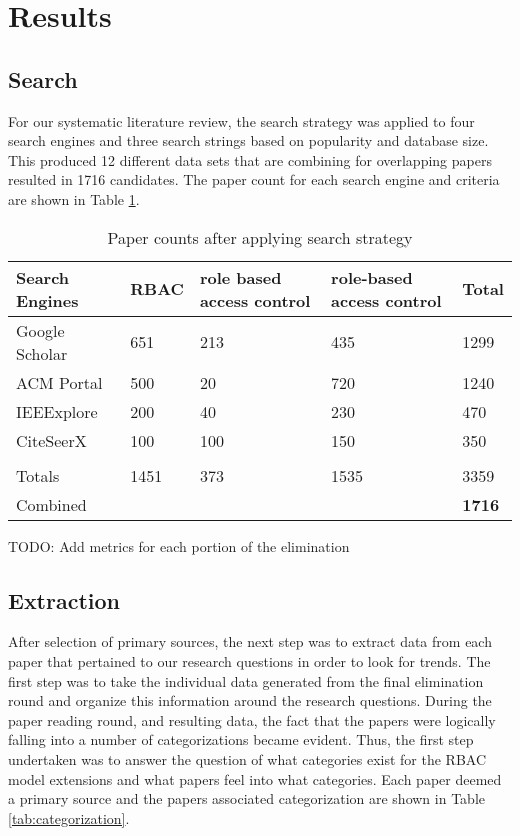 \section{Results} \label{sec:results}

\subsection{Search}

For our systematic literature review, the search strategy was applied to four search engines and three search strings based on popularity and database size.  This produced 12 different data sets that are combining for overlapping papers resulted in 1716 candidates.  The paper count for each search engine and criteria are shown in Table \ref{tab:search_results}.

\begin{table}
\centering
\begin{tabular}{|p{3.5cm}|p{1.25cm}|p{4.25cm}|p{4.25cm}|p{1cm}|}

\hline
\textbf{Search Engines} & 
\textbf{RBAC} & 
\textbf{role based access control} & 
\textbf{role-based access control} & 
\textbf{Total}
\\\hline

Google Scholar & 651 & 213 & 435 & 1299 \\\hline
ACM Portal & 500 & 20 & 720 & 1240 \\\hline
IEEExplore & 200 & 40 & 230 & 470 \\\hline
CiteSeerX & 100 & 100 & 150 & 350 \\\hline
 &  &  &  & \\\hline
Totals & 1451 & 373 & 1535 & 3359 \\\hline
Combined &  &  &  & \textbf{1716} \\\hline

\end{tabular}
\caption{Paper counts after applying search strategy}
\label{tab:search_results}
\end{table}

TODO: Add metrics for each portion of the elimination

\subsection{Extraction}

After selection of primary sources, the next step was to extract data from each paper that pertained to our research questions in order to look for trends.  The first step was to take the individual data generated from the final elimination round and organize this information around the research questions.  During the paper reading round, and resulting data, the fact that the papers were logically falling into a number of categorizations became evident.  Thus, the first step undertaken was to answer the question of what categories exist for the RBAC model extensions and what papers feel into what categories.  Each paper deemed a primary source and the papers associated categorization are shown in Table \ref{tab:categorization}.


